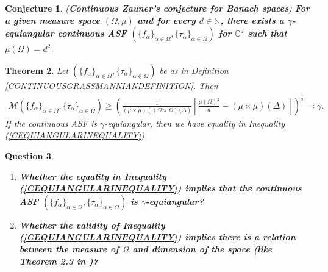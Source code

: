 \documentclass{amsart}
\newtheorem{theorem}{Theorem}[section]
\newtheorem{conjecture}[theorem]{Conjecture}
\newtheorem{question}[theorem]{Question}
\begin{document}
 \begin{conjecture}
 	(\textbf{Continuous Zauner's conjecture for Banach spaces}) \textbf{For a given measure space  $(\Omega, \mu)$ and for  every $d\in \mathbb{N}$, there exists a $\gamma$-equiangular  continuous ASF $(\{f_\alpha\}_{\alpha\in \Omega}, \{\tau_\alpha\}_{\alpha\in \Omega})$  for $\mathbb{C}^d$ such that $\mu(\Omega)=d^2$}.
 \end{conjecture}
 
 
 \begin{theorem}\label{CNG3}
 	Let  $ (\{f_\alpha\}_{\alpha\in \Omega}, \{\tau_\alpha\}_{\alpha\in \Omega}) $ be as in Definition \ref{CONTINUOUSGRASSMANNIANDEFINITION}. Then 
 	\begin{align}\label{CEQUIANGULARINEQUALITY}
 		\mathcal{M}(\{f_\alpha\}_{\alpha\in \Omega}, \{\tau_\alpha\}_{\alpha\in \Omega}) \geq \left(\frac{1}{(\mu\times\mu)((\Omega\times\Omega)\setminus\Delta)}\left[\frac{\mu(\Omega)^2}{d}-(\mu\times\mu)(\Delta)\right]\right)^\frac{1}{2}\eqqcolon\gamma.
 	\end{align}
 	If the continuous ASF is $\gamma$-equiangular, then we have equality in Inequality (\ref{CEQUIANGULARINEQUALITY}).
 \end{theorem}
 \begin{question}
 	\begin{enumerate}[\upshape (i)]
 		\item \textbf{	Whether the equality in Inequality (\ref{CEQUIANGULARINEQUALITY}) implies that the continuous ASF $ (\{f_\alpha\}_{\alpha\in \Omega}, \{\tau_\alpha\}_{\alpha\in \Omega})$  is $\gamma$-equiangular?}
 		\item \textbf{Whether the validity of  Inequality (\ref{CEQUIANGULARINEQUALITY}) implies   there is a relation between the measure of $\Omega$ and dimension of the space (like Theorem 2.3 in \cite{STROHMERHEATH})?}
 	\end{enumerate}
 \end{question}
  
  
  
  
  
  
 
 
 
\end{document}
